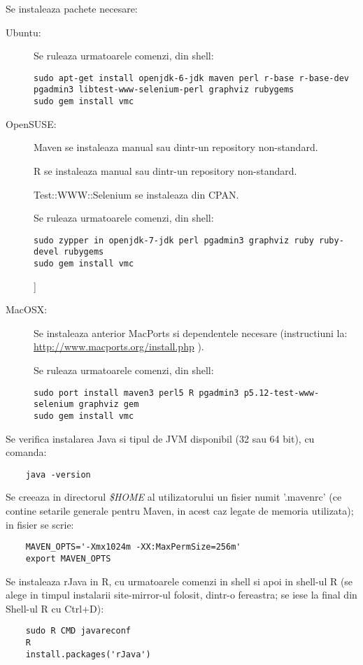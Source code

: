 Se instaleaza pachete necesare:
\begin{description}
\item[Ubuntu:]
Se ruleaza urmatoarele comenzi, din shell:
\begin{lstlisting}[breaklines=true]
sudo apt-get install openjdk-6-jdk maven perl r-base r-base-dev pgadmin3 libtest-www-selenium-perl graphviz rubygems
sudo gem install vmc
\end{lstlisting}
\item[OpenSUSE:]
Maven se instaleaza manual sau dintr-un repository non-standard.

R se instaleaza manual sau dintr-un repository non-standard.

Test::WWW::Selenium se instaleaza din CPAN.

Se ruleaza urmatoarele comenzi, din shell:
\begin{lstlisting}[breaklines=true]
sudo zypper in openjdk-7-jdk perl pgadmin3 graphviz ruby ruby-devel rubygems
sudo gem install vmc
\end{lstlisting}]

\item[MacOSX:]
Se instaleaza anterior MacPorts si dependentele necesare (instructiuni la:
\url{http://www.macports.org/install.php} ).

Se ruleaza urmatoarele comenzi, din shell:
\begin{lstlisting}[breaklines=true]
sudo port install maven3 perl5 R pgadmin3 p5.12-test-www-selenium graphviz gem
sudo gem install vmc
\end{lstlisting}
\end{description}

Se verifica instalarea Java si tipul de JVM disponibil (32 sau 64 bit), cu comanda:
\begin{lstlisting}
	java -version
\end{lstlisting}

Se creeaza in directorul \emph{\$HOME} al utilizatorului un fisier numit
'.mavenrc' (ce contine setarile generale pentru Maven, in acest caz legate de memoria utilizata);
in fisier se scrie:
\begin{lstlisting}
	MAVEN_OPTS='-Xmx1024m -XX:MaxPermSize=256m'
	export MAVEN_OPTS
\end{lstlisting}

Se instaleaza rJava in R, cu urmatoarele comenzi in shell si apoi in shell-ul R
(se alege in timpul instalarii site-mirror-ul folosit, dintr-o fereastra;
se iese la final din Shell-ul R cu Ctrl+D):
\begin{lstlisting}
	sudo R CMD javareconf
	R
	install.packages('rJava')
\end{lstlisting}

